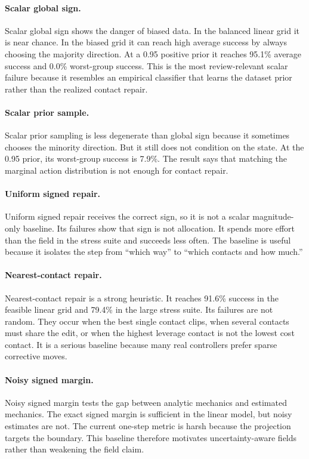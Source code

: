\documentclass{article}
\begin{document}
\paragraph{Scalar global sign.}
Scalar global sign shows the danger of biased data. In the balanced linear grid it is near chance. In the biased grid it can reach high average success by always choosing the majority direction. At a 0.95 positive prior it reaches 95.1\% average success and 0.0\% worst-group success. This is the most review-relevant scalar failure because it resembles an empirical classifier that learns the dataset prior rather than the realized contact repair.

\paragraph{Scalar prior sample.}
Scalar prior sampling is less degenerate than global sign because it sometimes chooses the minority direction. But it still does not condition on the state. At the 0.95 prior, its worst-group success is 7.9\%. The result says that matching the marginal action distribution is not enough for contact repair.

\paragraph{Uniform signed repair.}
Uniform signed repair receives the correct sign, so it is not a scalar magnitude-only baseline. Its failures show that sign is not allocation. It spends more effort than the field in the stress suite and succeeds less often. The baseline is useful because it isolates the step from ``which way'' to ``which contacts and how much.''

\paragraph{Nearest-contact repair.}
Nearest-contact repair is a strong heuristic. It reaches 91.6\% success in the feasible linear grid and 79.4\% in the large stress suite. Its failures are not random. They occur when the best single contact clips, when several contacts must share the edit, or when the highest leverage contact is not the lowest cost contact. It is a serious baseline because many real controllers prefer sparse corrective moves.

\paragraph{Noisy signed margin.}
Noisy signed margin tests the gap between analytic mechanics and estimated mechanics. The exact signed margin is sufficient in the linear model, but noisy estimates are not. The current one-step metric is harsh because the projection targets the boundary. This baseline therefore motivates uncertainty-aware fields rather than weakening the field claim.
\end{document}
